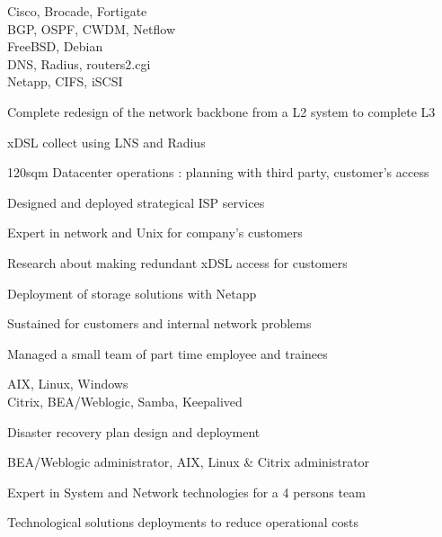 \documentclass[a4paper,11pt]{cv4tw}%
\begin{document}
	{Cisco, Brocade, Fortigate\\BGP, OSPF, CWDM, Netflow\\FreeBSD, Debian\\DNS, Radius, routers2.cgi\\Netapp, CIFS, iSCSI}
		{
		\begin{missions}
			\item Complete redesign of the network backbone from a L2 system to complete L3
			\item xDSL collect using LNS and Radius
			\item 120sqm Datacenter operations : planning with third party, customer's access
			\item Designed and deployed strategical ISP services
			\item Expert in network and Unix for company's customers
			\item Research about making redundant xDSL access for customers
			\item Deployment of storage solutions with Netapp
			\item Sustained for customers and internal network problems
			\item Managed a small team of part time employee and trainees
		\end{missions}
	}


	{AIX, Linux, Windows\\Citrix, BEA/Weblogic, Samba, Keepalived}
		{
		\begin{missions}
			\item Disaster recovery plan design and deployment
			\item BEA/Weblogic administrator, AIX, Linux \& Citrix administrator
			\item Expert in System and Network technologies for a 4 persons team
			\item Technological solutions deployments to reduce operational costs
		\end{missions}
	}
\end{document}
